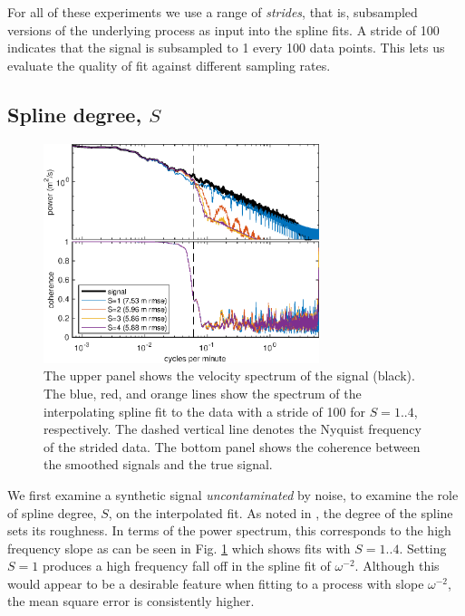 \documentclass{ametsoc}
\begin{document}
For all of these experiments we use a range of \emph{strides}, that is, subsampled versions of the underlying process as input into the spline fits. A stride of 100 indicates that the signal is subsampled to 1 every 100 data points. This lets us evaluate the quality of fit against different sampling rates.

\subsection{Spline degree, $S$} \label{spline_degree}

\begin{figure}
  \centerline{\includegraphics[width=19pc,angle=0]{interpolation_spectrum_slope2degreeVaried.eps}}
  \caption{The upper panel shows the velocity spectrum of the signal (black). The blue, red, and orange lines show the spectrum of the interpolating spline fit to the data with a stride of 100 for $S=1..4$, respectively. The dashed vertical line denotes the Nyquist frequency of the strided data. The bottom panel shows the coherence between the smoothed signals and the true signal.}
  \label{varied_slope}
\end{figure}

We first examine a synthetic signal \emph{uncontaminated} by noise, to examine the role of spline degree, $S$, on the interpolated fit. As noted in \citet{craven1979-nm}, the degree of the spline sets its roughness. In terms of the power spectrum, this corresponds to the high frequency slope as can be seen in Fig. \ref{varied_slope} which shows fits with $S=1..4$. Setting $S=1$ produces a high frequency fall off in the spline fit of $\omega^{-2}$. Although this would appear to be a desirable feature when fitting to a process with slope $\omega^{-2}$, the mean square error is consistently higher.
\end{document}
